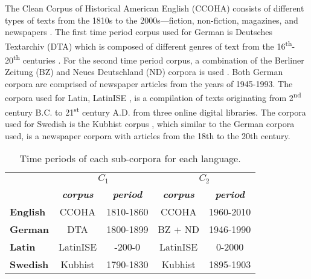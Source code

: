 The Clean Corpus of Historical American English (CCOHA) consists of different types of texts from the 1810s to the 2000s—fiction, non-fiction, magazines, and newspapers \citep{davies2012expanding, alatrash-etal-2020-ccoha}. The first time period corpus used for German is Deutsches Textarchiv (DTA) which is composed of different genres of text from the 16\textsuperscript{th}-20\textsuperscript{th} centuries \citep{dta2017}. For the second time period corpus, a combination of the Berliner Zeitung (BZ) and Neues Deutschland (ND) corpora is used \citep{berliner2018,neues2018}. Both German corpora are comprised of newspaper articles from the years of 1945-1993. The corpora used for Latin, LatinISE \citep{mcgillivray-kilgarriff}, is a compilation of texts originating from 2\textsuperscript{nd} century B.C. to 21\textsuperscript{st} century A.D. from three online digital libraries. The corpora used for Swedish is the Kubhist corpus \citep{Kubhist}, which similar to the German corpora used, is a newspaper corpora with articles from the 18th to the 20th century. \hfill \break

\begin{table}[h]
\small
\centering
\begin{tabular}{l|cc|cc|}
\cline{2-5}
\textbf{}      & \multicolumn{2}{c|}{\textbf{$C_1$}}                    & \multicolumn{2}{c|}{\textbf{$C_2$}}                    \\
                                       & \textit{\textbf{corpus}} & \textit{\textbf{period}} & \textit{\textbf{corpus}} & \textit{\textbf{period}} \\ \hline
\multicolumn{1}{|l|}{\textbf{English}} & CCOHA                    & 1810-1860                & CCOHA                    & 1960-2010                \\ \hline
\multicolumn{1}{|l|}{\textbf{German}}  & DTA                      & 1800-1899                & BZ + ND                  & 1946-1990                \\ \hline
\multicolumn{1}{|l|}{\textbf{Latin}}   & LatinISE                 & -200-0                   & LatinISE                 & 0-2000                   \\ \hline
\multicolumn{1}{|l|}{\textbf{Swedish}} & Kubhist                  & 1790-1830                & Kubhist                  & 1895-1903                \\ \hline
\end{tabular}
\caption{Time periods of each sub-corpora for each language.}
\label{tab:subcorpora-time}
\end{table}

